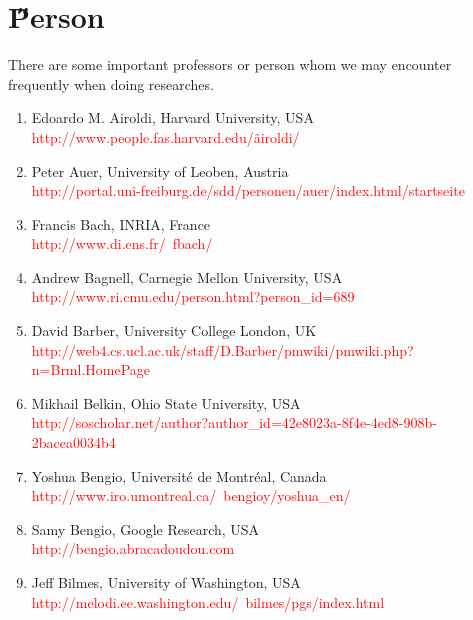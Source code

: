 \documentclass[a4paper,12pt,oneside]{book}
\newcommand{\red}[1]{  \textcolor{red}  {#1}}   %
\begin{document}
\section{\H Person}
There are some important professors or person whom we may encounter frequently when doing researches.

\begin{enumerate}
\item Edoardo M. Airoldi, Harvard University, USA\\
\quad\red{http://www.people.fas.harvard.edu/\~airoldi/}\\

\item Peter Auer, University of Leoben, Austria\\
\quad\red{http://portal.uni-freiburg.de/sdd/personen/auer/index.html/startseite}\\

\item Francis Bach, INRIA, France\\
\quad\red{http://www.di.ens.fr/~fbach/}\\

\item Andrew Bagnell, Carnegie Mellon University, USA\\
\quad\red{http://www.ri.cmu.edu/person.html?person\_id=689}\\

\item David Barber, University College London, UK\\
\quad\red{http://web4.cs.ucl.ac.uk/staff/D.Barber/pmwiki/pmwiki.php?n=Brml.HomePage}\\

\item Mikhail Belkin, Ohio State University, USA\\
\quad\red{http://soscholar.net/author?author\_id=42e8023a-8f4e-4ed8-908b-2bacea0034b4}\\

\item Yoshua Bengio, Université de Montréal, Canada\\
\quad\red{http://www.iro.umontreal.ca/~bengioy/yoshua\_en/}\\

\item Samy Bengio, Google Research, USA\\
\quad\red{http://bengio.abracadoudou.com}\\

\item Jeff Bilmes, University of Washington, USA\\
\quad\red{http://melodi.ee.washington.edu/~bilmes/pgs/index.html}\\


\end{enumerate}
\end{document}
